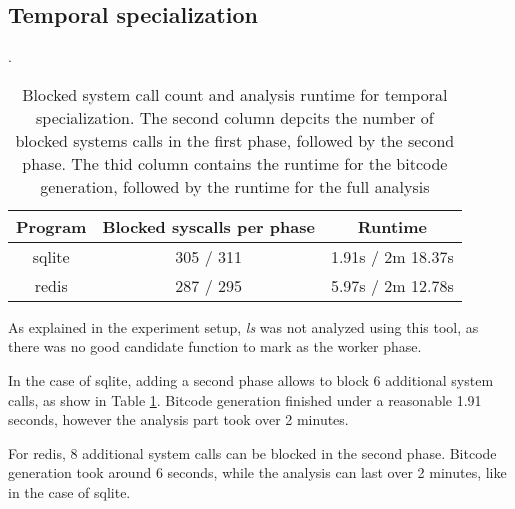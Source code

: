 \subsection {Temporal specialization}
\begin{table}[!h]
\begin{center}
\caption{Blocked system call count and analysis runtime for temporal specialization. The second column depcits the number of blocked systems calls in the first phase, followed by the second phase. The thid column contains the runtime for the bitcode generation, followed by the runtime for the full analysis}.
\label{tbl:tmp_spec_results}
\begin{tabular}{||c c c||}
 \hline
 Program & Blocked syscalls per phase & Runtime \\
 \hline\hline
 sqlite & 305 / 311 & 1.91s / 2m 18.37s \\
 \hline
 redis & 287 / 295 & 5.97s / 2m 12.78s \\
 \hline
\end{tabular}
\end{center}
\end{table}
As explained in the experiment setup, \textit{ls} was not analyzed using this tool, as there was no good candidate function to mark as the worker phase.

In the case of sqlite, adding a second phase allows to block 6 additional system calls, as show in Table \ref{tbl:tmp_spec_results}. Bitcode generation finished under a reasonable 1.91 seconds, however the analysis part took over 2 minutes.

For redis, 8 additional system calls can be blocked in the second phase. Bitcode generation took around 6 seconds, while the analysis can last over 2 minutes, like in the case of sqlite.
